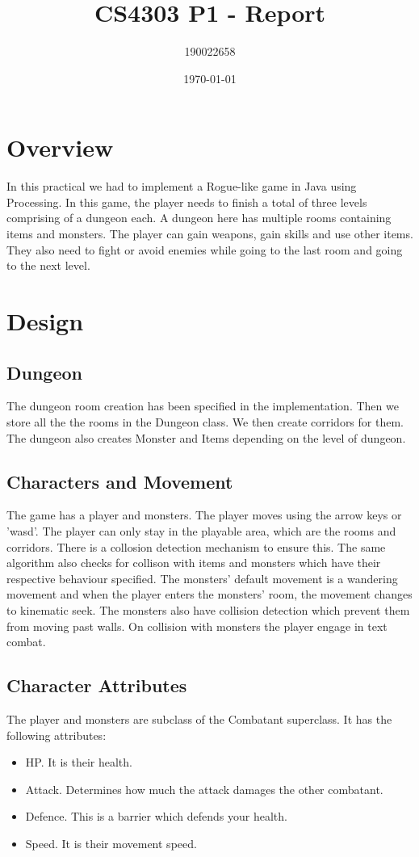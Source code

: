 \documentclass[11pt]{article}
\author{190022658}
\date{\today}
\title{CS4303 P1 - Report}
\begin{document}
\maketitle

\section{Overview}
\label{sec:org51d12e5}
In this practical we had to implement a Rogue-like game in Java using Processing. In this game, the player needs to finish a total of three levels comprising of a dungeon each. A dungeon here has multiple rooms containing items and monsters. The player can gain weapons, gain skills and use other items. They also need to fight or avoid enemies while going to the last room and going to the next level.

\section{Design}
\label{sec:org4925faf}
\subsection{Dungeon}
\label{sec:org37797eb}
The dungeon room creation has been specified in the implementation. Then we store all the the rooms in the Dungeon class. We then create corridors for them. The dungeon also creates Monster and Items depending on the level of dungeon.
\subsection{Characters and Movement}
\label{sec:orgc79bec9}
The game has a player and monsters. The player moves using the arrow keys or 'wasd'. The player can only stay in the playable area, which are the rooms and corridors. There is a collosion detection mechanism to ensure this. The same algorithm also checks for collison with items and monsters which have their respective behaviour specified. The monsters' default movement is a wandering movement and when the player enters the monsters' room, the movement changes to kinematic seek. The monsters also have collision detection which prevent them from moving past walls. On collision with monsters the player engage in text combat.
\subsection{Character Attributes}
\label{sec:orgc6165a1}
The player and monsters are subclass of the Combatant superclass. It has the following attributes:
\begin{itemize}
\item HP. It is their health.
\item Attack. Determines how much the attack damages the other combatant.
\item Defence. This is a barrier which defends your health.
\item Speed. It is their movement speed.
\end{itemize}
\end{document}
